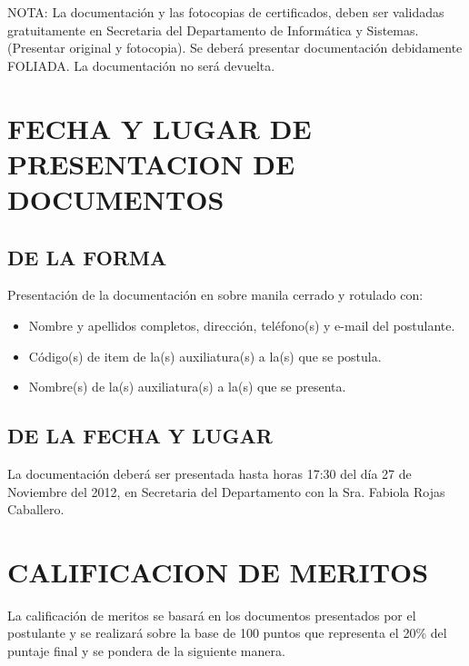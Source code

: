 \documentclass[letterpaper,11pt]{article}
\begin{document}
NOTA: La documentación y las fotocopias de certificados, deben ser validadas gratuitamente en Secretaria del Departamento de Informática y Sistemas. (Presentar original y fotocopia). Se deberá presentar documentación debidamente FOLIADA. La documentación no será devuelta.

\section{FECHA Y LUGAR DE PRESENTACION DE DOCUMENTOS}
\subsection{DE LA FORMA}
Presentación de la documentación en sobre manila cerrado y rotulado con:

\begin{itemize}
\item Nombre y apellidos completos, dirección, teléfono(s) y e-mail del postulante.
\item Código(s) de item de la(s) auxiliatura(s) a la(s) que se postula.
\item Nombre(s) de la(s) auxiliatura(s) a la(s) que se presenta.
\end{itemize}

\subsection{DE LA FECHA Y LUGAR}
La documentación deberá ser presentada hasta horas 17:30 del día 27 de Noviembre del 2012, en Secretaria del Departamento con la Sra. Fabiola Rojas Caballero.

\section{CALIFICACION DE MERITOS}
La calificación de meritos se basará en los documentos presentados por el postulante y se realizará sobre la base de 100 puntos que representa el 20\% del puntaje final y se pondera de la siguiente manera.
\end{document}
